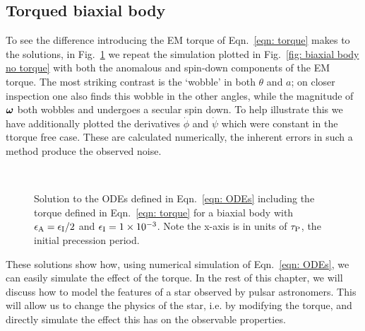 \documentclass[../full_thesis/full_thesis.tex]{subfiles}
\begin{document}
\subsection{Torqued biaxial body}
To see the difference introducing the EM torque of Eqn.~\eqref{eqn: torque}  makes to the
solutions, in Fig.~\ref{fig: biaxial body with torque} we repeat the simulation
plotted in Fig.~\ref{fig: biaxial body no torque} with both the anomalous
and spin-down components of the EM torque. The most
striking contrast is the `wobble' in both $\theta$ and $a$; on closer
inspection one also finds this wobble in the other angles, while the magnitude of
$\boldsymbol{\omega}$ both wobbles and undergoes a secular spin down. To help illustrate
this we have additionally plotted the derivatives $\dot{\phi}$ and $\dot{\psi}$
which were constant in the ttorque free case. These are calculated numerically,
the inherent errors in such a method produce the observed noise.
\afterpage{\clearpage}
\begin{figure}[p]
    \centering
{} \\
\caption{Solution to the ODEs defined in Eqn.~\eqref{eqn: ODEs} including the
torque defined in Eqn.~\eqref{eqn: torque} for a biaxial body with
$\epsilon_{\mathrm{A}}=\epsilon_{\mathrm{I}}/2$ and $\epsilon_{\mathrm{I}}=1\times10^{-3}$. Note the x-axis is in units of
$\tau_{\mathrm{P}}$, the initial precession period.}
\label{fig: biaxial body with torque}
\end{figure}

These solutions show how, using numerical simulation of Eqn.~\eqref{eqn: ODEs},
we can easily simulate the effect of the \citet{Deutsch1955} torque. In the rest
of this chapter, we will discuss how to model the features of a star observed
by pulsar astronomers. This will allow us to change the physics of the star,
i.e. by modifying the torque, and directly simulate the effect this has on
the observable properties.
\end{document}
